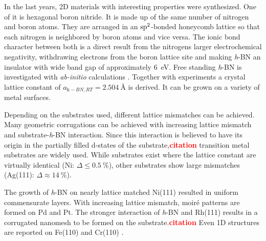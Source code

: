 In the last years, 2D materials with interesting properties were synthesized. One of it is hexagonal boron nitride. It is made up of the same number of nitrogen and boron atoms. They are arranged in an $\textnormal{sp}^2$-bonded honeycomb lattice so that each nitrogen is neighbored by boron atoms and vice versa. The ionic bond character between both is a direct result from the nitrogens larger electrochemical negativity, withdrawing electrons from the boron lattice site and making \textit{h}-BN an insulator with wide band gap of approximately \SI{6}{\eV}. \cite{watanabe_direct-bandgap_2004, cassabois_hexagonal_2016, blase_quasiparticle_1995} Free standing \textit{h}-BN is investigated with \textit{ab-initio} calculations \cite{han_effects_2014,mortazavi_investigation_2012,topsakal_first-principles_2009,peng_mechanical_2012}. Together with experiments \cite{paszkowicz_lattice_2002} a crystal lattice constant of $a_{\textit{h}-BN, RT}=\SI{2.504}{\angstrom}$ is derived.  It can be grown on a variety of metal surfaces.\cite{muller_epitaxial_2010,muller_one-dimensional_2008,guo_controllable_2012-4,siegel_heterogeneous_2017,schwarz_corrugation_2017,joshi_boron_2012,preobrajenski_monolayer_2005,vinogradov_one-dimensional_2012,farwick_zum_hagen_structure_2016,schulz_epitaxial_2014,Schulz_Templated_2013,gomez_diaz_hexagonal_2013,usachov_experimental_2012,orlando_epitaxial_2012,preobrajenski_monolayer_2007-1,preobrajenski_monolayer_2005,auwarter_synthesis_2004-1,auwarter_xpd_1999,nagashima_electronic_1995,corso_h-bn_2005,morscher_formation_2006,nagashima_electronic_1995,cavar_single_2008,muller_symmetry_2005,nagashima_electronic_1995,gomez_diaz_hexagonal_2013,dong_how_2010,brugger_reversible_2010,preobrajenski_monolayer_2007-1,berner_boron_2007,corso_boron_2004,brugger_comparison_2009,goriachko_self-assembly_2007}

 Depending on the substrates used, different lattice mismatches can be achieved. Many geometric corrugations can be achieved with increasing lattice mismatch and substrate-\textit{h}-BN interaction. Since this interaction is believed to have its origin in the partially filled d-states of the substrate,\textcolor{red}{\textbf{citation}} transition metal substrates are widely used. While substrates exist where the lattice constant are virtually identical (Ni: $\Delta \leq \SI{0.5}{\percent}$), other substrates show large mismatches (Ag(111): $\Delta \approx \SI{14}{\percent}$).

The growth of \textit{h}-BN on nearly lattice matched Ni(111) resulted in uniform commensurate layers. With increasing lattice mismatch, moir\'e patterns are formed on Pd and Pt. The stronger interaction of \textit{h}-BN and Rh(111) results in a corrugated nanomesh to be formed on the substrate.\textcolor{red}{\textbf{citation}} Even 1D structures are reported on Fe(110) \cite{vinogradov_one-dimensional_2012} and Cr(110) \cite{muller_one-dimensional_2008}. 

